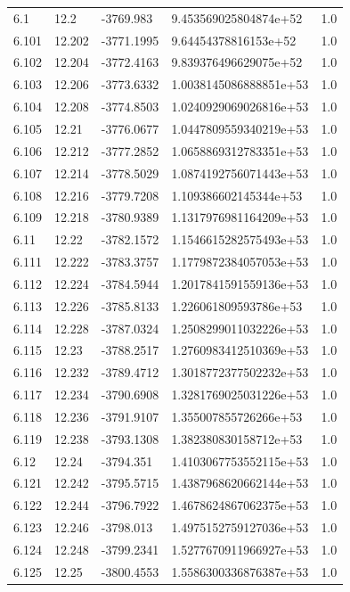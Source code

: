 \begin{tabular}{lllll}
6.1 & 12.2 & -3769.983 & 9.453569025804874e+52 & 1.0 \\
6.101 & 12.202 & -3771.1995 & 9.64454378816153e+52 & 1.0 \\
6.102 & 12.204 & -3772.4163 & 9.839376496629075e+52 & 1.0 \\
6.103 & 12.206 & -3773.6332 & 1.0038145086888851e+53 & 1.0 \\
6.104 & 12.208 & -3774.8503 & 1.0240929069026816e+53 & 1.0 \\
6.105 & 12.21 & -3776.0677 & 1.0447809559340219e+53 & 1.0 \\
6.106 & 12.212 & -3777.2852 & 1.0658869312783351e+53 & 1.0 \\
6.107 & 12.214 & -3778.5029 & 1.0874192756071443e+53 & 1.0 \\
6.108 & 12.216 & -3779.7208 & 1.109386602145344e+53 & 1.0 \\
6.109 & 12.218 & -3780.9389 & 1.1317976981164209e+53 & 1.0 \\
6.11 & 12.22 & -3782.1572 & 1.1546615282575493e+53 & 1.0 \\
6.111 & 12.222 & -3783.3757 & 1.1779872384057053e+53 & 1.0 \\
6.112 & 12.224 & -3784.5944 & 1.2017841591559136e+53 & 1.0 \\
6.113 & 12.226 & -3785.8133 & 1.226061809593786e+53 & 1.0 \\
6.114 & 12.228 & -3787.0324 & 1.2508299011032226e+53 & 1.0 \\
6.115 & 12.23 & -3788.2517 & 1.2760983412510369e+53 & 1.0 \\
6.116 & 12.232 & -3789.4712 & 1.3018772377502232e+53 & 1.0 \\
6.117 & 12.234 & -3790.6908 & 1.3281769025031226e+53 & 1.0 \\
6.118 & 12.236 & -3791.9107 & 1.355007855726266e+53 & 1.0 \\
6.119 & 12.238 & -3793.1308 & 1.382380830158712e+53 & 1.0 \\
6.12 & 12.24 & -3794.351 & 1.4103067753552115e+53 & 1.0 \\
6.121 & 12.242 & -3795.5715 & 1.4387968620662144e+53 & 1.0 \\
6.122 & 12.244 & -3796.7922 & 1.4678624867062375e+53 & 1.0 \\
6.123 & 12.246 & -3798.013 & 1.4975152759127036e+53 & 1.0 \\
6.124 & 12.248 & -3799.2341 & 1.5277670911966927e+53 & 1.0 \\
6.125 & 12.25 & -3800.4553 & 1.5586300336876387e+53 & 1.0 \\

\end{tabular}
